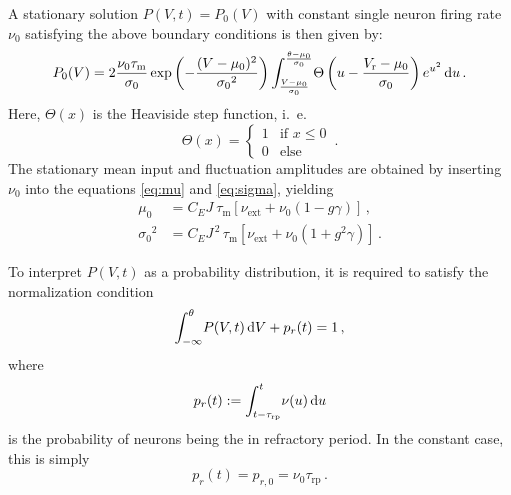 A stationary solution $P(V, t) = P_0(V)$ with constant 
single neuron firing rate $\nu_0$ 
satisfying the above boundary conditions is then given by:
\begin{equation}
    P_0(V) = 2 \frac{\nu_0 \tau_\text{m}}{\sigma_0} 
        \exp{\left(- \frac{(V - \mu_0)^2}{{\sigma_0}^2} \right)}
        \int_{\frac{V - \mu_0}{\sigma_0}}^{\frac{\theta - \mu_0}{\sigma_0}} \! 
            \Theta \left(u - \frac{V_\text{r} - \mu_0}{\sigma_0} \right) e^{u^2} \mathop{}\!\text{d} u  \,. 
    \label{eq:P_V_0}
\end{equation}
Here, $\Theta(x)$ is the Heaviside step function, i.~e. 
\begin{equation}
    \Theta(x) = \begin{cases} 1 & \text{if } x \le 0 \\ 0 & \text{else } \end{cases}  \,.
    \label{eq:heaviside}
\end{equation}
The stationary mean input and fluctuation amplitudes are obtained by inserting 
$\nu_0$ into the equations \eqref{eq:mu} and \eqref{eq:sigma}, yielding 
\begin{align}
    \mu_0 	    &= C_E J \:\tau_\text{m} [\nu_\text{ext} + \nu_0(1 - g \gamma)]  \,, \\ 
    {\sigma_0}^2 	&= C_E J^{\,2} \,\tau_\text{m} [\nu_\text{ext} + \nu_0(1 + g^2 \gamma)] \,.
    \label{eq:mu_sigma_0}
\end{align}

To interpret $P(V, t)$ as a probability distribution, it is required to
satisfy the normalization condition
\begin{equation}
    \int_{-\infty}^{\theta} \! P(V, t) \mathop{}\!\text{d} V  + p_r(t) = 1 \, ,
    \label{eq:P_V_prob}
\end{equation}
where 
\begin{equation}
    p_r(t) := \int_{t - \tau_\text{rp}}^{t} \! \nu(u) \mathop{}\!\text{d} u 
    \label{eq:p_r}
\end{equation}
is the probability of neurons being the in refractory period.
In the constant case, this is simply 
\begin{equation}
    p_r(t) = p_{r, 0} = \nu_0 \tau_\text{rp}  \,.
    \label{eq:p_r_0}
\end{equation}

